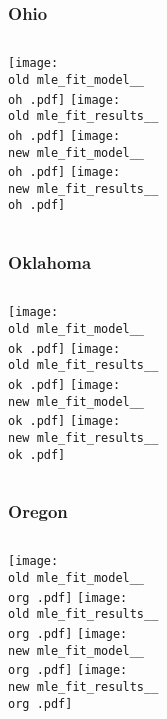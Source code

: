 \documentclass{beamer}
\newcommand{\old}{api-370-prod/pyseir/state_summaries/reports/}
\newcommand{\new}{new/pyseir/state_summaries/reports/}
\newcommand{\oh}{Ohio__39}
\newcommand{\ok}{Oklahoma__40}
\newcommand{\org}{Oregon__41}
\begin{document}
\begin{frame}
\frametitle{Ohio}
    \begin{columns}[t]

       \texttt{[image: \\old mle\_fit\_model\_\_\\oh .pdf]}
       \texttt{[image: \\old mle\_fit\_results\_\_\\oh .pdf]}   
       \texttt{[image: \\new mle\_fit\_model\_\_\\oh .pdf]}
       \texttt{[image: \\new mle\_fit\_results\_\_\\oh .pdf]}   
\end{columns}
\end{frame}

\begin{frame}
\frametitle{Oklahoma}
    \begin{columns}[t]

       \texttt{[image: \\old mle\_fit\_model\_\_\\ok .pdf]}
       \texttt{[image: \\old mle\_fit\_results\_\_\\ok .pdf]}   
       \texttt{[image: \\new mle\_fit\_model\_\_\\ok .pdf]}
       \texttt{[image: \\new mle\_fit\_results\_\_\\ok .pdf]}   
\end{columns}
\end{frame}


\begin{frame}
\frametitle{Oregon}
    \begin{columns}[t]

       \texttt{[image: \\old mle\_fit\_model\_\_\\org .pdf]}
       \texttt{[image: \\old mle\_fit\_results\_\_\\org .pdf]}   
       \texttt{[image: \\new mle\_fit\_model\_\_\\org .pdf]}
       \texttt{[image: \\new mle\_fit\_results\_\_\\org .pdf]}   
\end{columns}
\end{frame}
\end{document}

